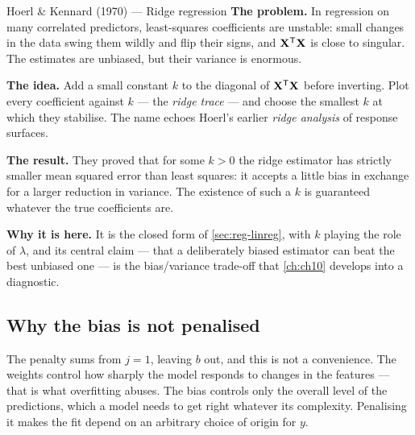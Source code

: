 \begin{researchspotlight}{Hoerl \& Kennard (1970) --- Ridge regression}
\textbf{The problem.} In regression on many correlated predictors, least-squares
coefficients are unstable: small changes in the data swing them wildly and flip
their signs, and $\mathbf{X}^{\mathsf{T}}\mathbf{X}$ is close to singular. The estimates
are unbiased, but their variance is enormous.

\textbf{The idea.} Add a small constant $k$ to the diagonal of
$\mathbf{X}^{\mathsf{T}}\mathbf{X}$ before inverting. Plot every coefficient against $k$
--- the \emph{ridge trace} --- and choose the smallest $k$ at which they
stabilise. The name echoes Hoerl's earlier \emph{ridge analysis} of response
surfaces.

\textbf{The result.} They proved that for some $k > 0$ the ridge estimator has
strictly smaller mean squared error than least squares: it accepts a little bias
in exchange for a larger reduction in variance. The existence of such a $k$ is
guaranteed whatever the true coefficients are.

\textbf{Why it is here.} It is the closed form of \cref{sec:reg-linreg}, with
$k$ playing the role of $\lambda$, and its central claim --- that a deliberately
biased estimator can beat the best unbiased one --- is the bias/variance
trade-off that \cref{ch:ch10} develops into a diagnostic.
\parencite{hoerl1970}
\end{researchspotlight}

\subsection{Why the bias is not penalised}
\label{sec:why-not-b}

The penalty sums from $j = 1$, leaving $b$ out, and this is not a convenience.
The weights control how sharply the model responds to changes in the features
--- that is what overfitting abuses. The bias controls only the overall level of
the predictions, which a model needs to get right whatever its complexity.
Penalising it makes the fit depend on an arbitrary choice of origin for $y$.

